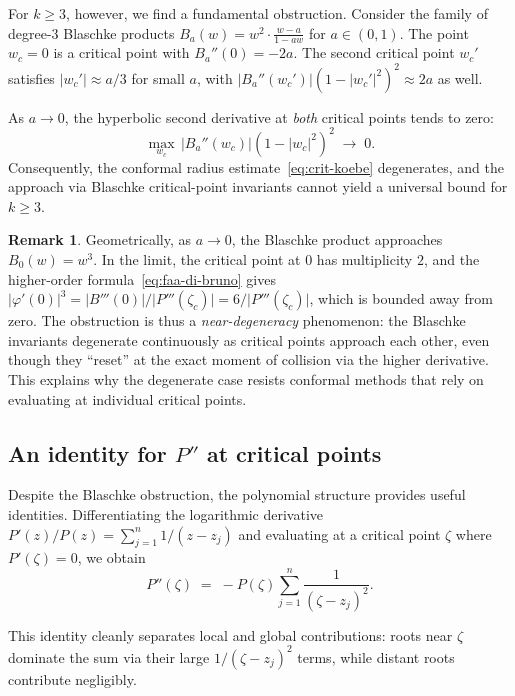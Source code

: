 \documentclass[11pt,a4paper]{amsart}
\theoremstyle{definition}
\newtheorem{remark}[theorem]{Remark}
\newcommand{\abs}[1]{\lvert #1 \rvert}
\begin{document}
For $k \geq 3$, however, we find a fundamental obstruction.
Consider the family of degree-$3$ Blaschke products
$B_a(w) = w^2 \cdot \frac{w-a}{1-aw}$ for $a \in (0,1)$.
The point $w_c = 0$ is a critical point with $B_a''(0) = -2a$.
The second critical point $w_c'$ satisfies $\abs{w_c'} \approx a/3$
for small $a$, with $\abs{B_a''(w_c')}(1-\abs{w_c'}^2)^2 \approx 2a$
as well.

As $a \to 0$, the hyperbolic second derivative at \emph{both}
critical points tends to zero:
\[
  \max_{w_c}\, \abs{B_a''(w_c)}(1-\abs{w_c}^2)^2 \;\to\; 0.
\]
Consequently, the conformal radius estimate~\eqref{eq:crit-koebe}
degenerates, and the approach via Blaschke critical-point invariants
cannot yield a universal bound for $k \geq 3$.

\begin{remark}
Geometrically, as $a \to 0$, the Blaschke product approaches
$B_0(w) = w^3$.  In the limit, the critical point at $0$ has
multiplicity $2$, and the higher-order formula~\eqref{eq:faa-di-bruno}
gives $\abs{\varphi'(0)}^3 = \abs{B'''(0)}/\abs{P'''(\zeta_c)} = 6/\abs{P'''(\zeta_c)}$,
which is bounded away from zero.  The obstruction is thus a
\emph{near-degeneracy} phenomenon: the Blaschke invariants degenerate
continuously as critical points approach each other, even though they
``reset'' at the exact moment of collision via the higher derivative.
This explains why the degenerate case resists conformal methods that
rely on evaluating at individual critical points.
\end{remark}

\subsection{An identity for $P''$ at critical points}

Despite the Blaschke obstruction, the polynomial structure provides
useful identities.  Differentiating the logarithmic derivative
$P'(z)/P(z) = \sum_{j=1}^n 1/(z-z_j)$ and evaluating at a critical
point $\zeta$ where $P'(\zeta) = 0$, we obtain
\begin{equation}\label{eq:Ppp-identity}
  P''(\zeta) \;=\; -P(\zeta) \sum_{j=1}^n \frac{1}{(\zeta - z_j)^2}.
\end{equation}

This identity cleanly separates local and global contributions:
roots near $\zeta$ dominate the sum via their large $1/(\zeta-z_j)^2$
terms, while distant roots contribute negligibly.
\end{document}

